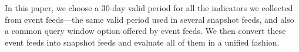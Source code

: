 In this paper, we choose a 30-day valid period for all the indicators we collected from event feeds---the same valid period
used in several snapshot feeds, and also a common query window option offered by event feeds.
We then convert these event feeds into snapshot feeds and evaluate all of them in a unified fashion.


\begin{comment}
Snapshot sources are build on a notion of emph{state}, namely, the current indicators
in the list at a certain moment, as indicators could be added and removed from
the source over time. This type of source mainly apply for IP feeds, as IP data
is time sensitive---a malicious IP address discovered now might not be malicious
in the future. One example of such source is {\feedfeodo}\cite{Feodo}, which records
a list of current Command and Control server IPs of Feodo botnet\cite{Feodo-Tracker}
that a site should block.

Event sources, on the other hand, is ``stateless'', they focus on what have been
discovered recently. One example of this type of source is {\feednothink}\cite{Nothink}.
Upon request, it returns the source IPs they collected that have conducted SSH
brute-force attack in the last day, last week or last year, depending on the specified
query option.

This structural difference doesn't concern file hash feeds, since file hashes are time
insensitive---a malicious file hash won't change to benign in the future. One can
think of all file hash feeds as snapshot feeds where indicators never expire.
\end{comment}
